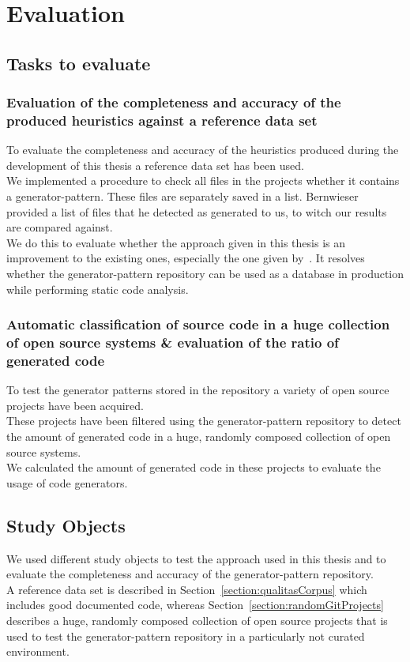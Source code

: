 
\chapter{Evaluation}\label{chapter:evaluation}
\section{Tasks to evaluate}

\subsection{Evaluation of the completeness and accuracy of the produced heuristics against a reference data set}
To evaluate the completeness and accuracy of the heuristics produced during the development of this thesis a reference data set has been used.\\
We implemented a procedure to check all files in the projects whether it contains a generator-pattern. These files are separately saved in a list. Bernwieser~\cite{Bernwieser2014} provided a list of files that he detected as generated to us, to witch our results are compared against. \\
We do this to evaluate whether the approach given in this thesis is an improvement to the existing ones, especially the one given by~\cite{Bernwieser2014}. It resolves whether the generator-pattern repository can be used as a database in production while performing static code analysis.

\subsection{Automatic classification of source code in a huge collection of open source systems \& evaluation of the ratio of generated code}
To test the generator patterns stored in the repository a variety of open source projects have been acquired.\\
These projects have been filtered using the generator-pattern repository to detect the amount of generated code in a huge, randomly composed collection of open source systems.\\
We calculated the amount of generated code in these projects to evaluate the usage of code generators. 

\section{Study Objects}
We used different study objects to test the approach used in this thesis and to evaluate the completeness and accuracy of the generator-pattern repository. \\
A reference data set is described in Section~\ref{section:qualitasCorpus} which includes good documented code, whereas Section~\ref{section:randomGitProjects} describes a huge, randomly composed collection of open source projects that is used to test the generator-pattern repository in a particularly not curated environment.
 
